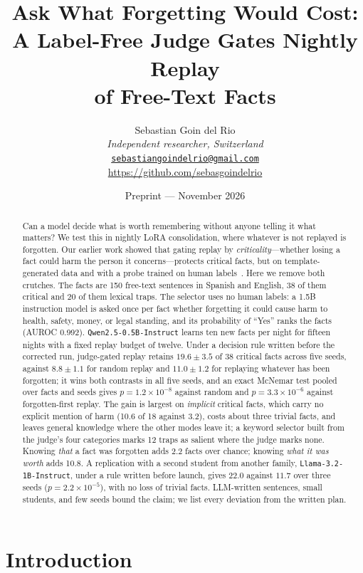\documentclass[11pt,a4paper]{article}
\title{Ask What Forgetting Would Cost:\\
A Label-Free Judge Gates Nightly Replay\\
of Free-Text Facts}
\author{Sebastian Goin del Rio\\
\textit{Independent researcher, Switzerland}\\
\href{mailto:sebastiangoindelrio@gmail.com}{\texttt{sebastiangoindelrio@gmail.com}}\\
\url{https://github.com/sebasgoindelrio}}
\date{Preprint --- November 2026}
\begin{document}
\maketitle
\thispagestyle{empty}
\pagestyle{plain}

\begin{abstract}
Can a model decide what is worth remembering without anyone telling it what matters?
We test this in nightly LoRA consolidation, where whatever is not replayed is forgotten.
Our earlier work showed that gating replay by \emph{criticality}---whether losing a fact could harm the person it concerns---protects critical facts, but on template-generated data and with a probe trained on human labels~\cite{goin2026surprise}.
Here we remove both crutches.
The facts are 150 free-text sentences in Spanish and English, 38 of them critical and 20 of them lexical traps.
The selector uses no human labels: a 1.5B instruction model is asked once per fact whether forgetting it could cause harm to health, safety, money, or legal standing, and its probability of ``Yes'' ranks the facts (AUROC 0.992).
\texttt{Qwen2.5-0.5B-Instruct} learns ten new facts per night for fifteen nights with a fixed replay budget of twelve.
Under a decision rule written before the corrected run, judge-gated replay retains $19.6{\pm}3.5$ of 38 critical facts across five seeds, against $8.8{\pm}1.1$ for random replay and $11.0{\pm}1.2$ for replaying whatever has been forgotten; it wins both contrasts in all five seeds, and an exact McNemar test pooled over facts and seeds gives $p{=}1.2{\times}10^{-8}$ against random and $p{=}3.3{\times}10^{-6}$ against forgotten-first replay.
The gain is largest on \emph{implicit} critical facts, which carry no explicit mention of harm (10.6 of 18 against 3.2), costs about three trivial facts, and leaves general knowledge where the other modes leave it; a keyword selector built from the judge's four categories marks 12 traps as salient where the judge marks none.
Knowing \emph{that} a fact was forgotten adds 2.2 facts over chance; knowing \emph{what it was worth} adds 10.8.
A replication with a second student from another family, \texttt{Llama-3.2-1B-Instruct}, under a rule written before launch, gives $22.0$ against $11.7$ over three seeds ($p{=}2.2{\times}10^{-5}$), with no loss of trivial facts.
LLM-written sentences, small students, and few seeds bound the claim; we list every deviation from the written plan.
\end{abstract}

\section{Introduction}
\end{document}
